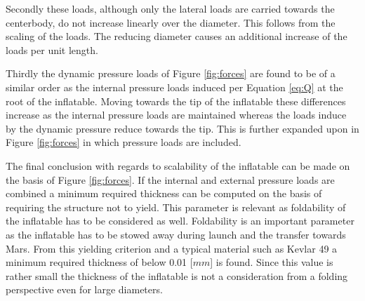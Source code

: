 Secondly these loads, although only the lateral loads are carried towards the centerbody, do not increase linearly over the diameter. This follows from the scaling of the loads. The reducing diameter causes an additional increase of the loads per unit length.

Thirdly the dynamic pressure loads of Figure \ref{fig:forces} are found to be of a similar order as the internal pressure loads induced per Equation \ref{eq:Q} at the root of the inflatable. Moving towards the tip of the inflatable these differences increase as the internal pressure loads are maintained whereas the loads induce by the dynamic pressure reduce towards the tip. This is further expanded upon in Figure \ref{fig:forces} in which pressure loads are included.

The final conclusion with regards to scalability of the inflatable can be made on the basis of Figure \ref{fig:forces}. If the internal and external pressure loads are combined a minimum required thickness can be computed on the basis of requiring the structure not to yield. This parameter is relevant as foldability of the inflatable has to be considered as well. Foldability is an important parameter as the inflatable has to be stowed away during launch and the transfer towards Mars. From this yielding criterion and a typical material such as Kevlar 49 a minimum required thickness of below 0.01 [$mm$] is found. Since this value is rather small the thickness of the inflatable is not a consideration from a folding perspective even for large diameters.
